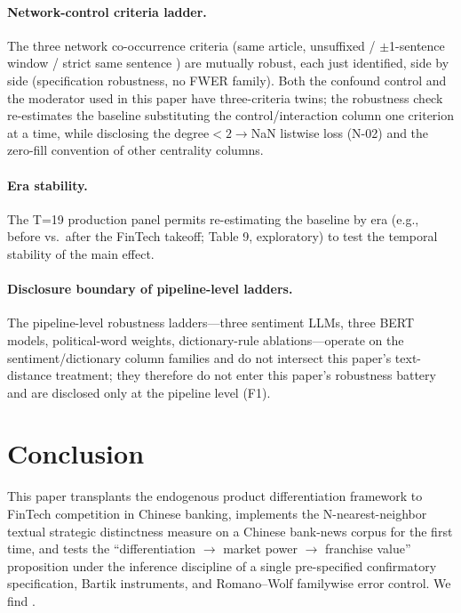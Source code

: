 \paragraph{Network-control criteria ladder.}
The three network co-occurrence criteria (same article, unsuffixed /
$\pm$1-sentence window  / strict same sentence
) are mutually robust, each just identified, side by
side (specification robustness, no FWER family). Both the
 confound control and the 
moderator used in this paper have three-criteria twins; the
robustness check re-estimates the baseline substituting the
control/interaction column one criterion at a time, while disclosing
the  degree$<2\to$NaN listwise loss (N-02)
and the zero-fill convention of other centrality columns.

\paragraph{Era stability.}
The T=19 production panel permits re-estimating the baseline by era
(e.g., before vs.\ after the FinTech takeoff; Table 9, exploratory)
to test the temporal stability of the main effect.

\paragraph{Disclosure boundary of pipeline-level ladders.}
The pipeline-level robustness ladders---three sentiment LLMs, three
BERT models, political-word weights, dictionary-rule
ablations---operate on the sentiment/dictionary column families and
do not intersect this paper's text-distance treatment; they therefore
do not enter this paper's robustness battery and are disclosed only
at the pipeline level (F1).

\section{Conclusion}\label{sec:concl}

This paper transplants the endogenous product differentiation
framework to FinTech competition in Chinese banking, implements the
N-nearest-neighbor textual strategic distinctness measure on a
Chinese bank-news corpus for the first time, and tests the
``differentiation $\to$ market power $\to$ franchise value''
proposition under the inference discipline of a single pre-specified
confirmatory specification, Bartik instruments, and Romano--Wolf
familywise error control. We find \@.

